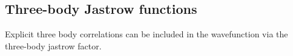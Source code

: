 % 



\subsection{Three-body Jastrow functions}
Explicit three body correlations can be included in the wavefunction via the three-body
jastrow factor.

